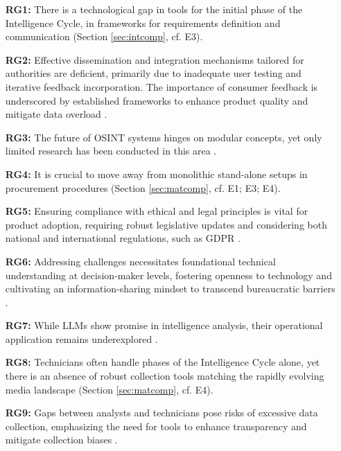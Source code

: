 \documentclass[10pt]{article}
\begin{document}
\begin{itemize}
    \item[\textbf{RG1:}] There is a technological gap in tools for the initial phase of the Intelligence Cycle, in frameworks for requirements definition and communication (Section \ref{sec:intcomp}, cf. E3).

        \item[\textbf{RG2:}]Effective dissemination and integration mechanisms tailored for authorities are deficient, primarily due to inadequate user testing and iterative feedback incorporation. The importance of consumer feedback is underscored by established frameworks to enhance product quality and mitigate data overload \cite{JointChiefsofStaffU.S.Army.2013, NorthAtlanticTreatyOrganization.2001}.

    \item[\textbf{RG3:}] The future of OSINT systems hinges on modular concepts, yet only limited research has been conducted in this area \cite{Arjun.2020,Wright.2020}.

    \item[\textbf{RG4:}] It is crucial to move away from monolithic stand-alone setups in procurement procedures (Section \ref{sec:matcomp}, cf. E1; E3; E4).

    \item[\textbf{RG5:}] Ensuring compliance with ethical and legal principles is vital for product adoption, requiring robust legislative updates and considering both national and international regulations, such as GDPR \cite{EuropeanParliament.2016,EuropeanCommission.18.08.2023,Wittmer.2022}.

    \item[\textbf{RG6:}] Addressing challenges necessitates foundational technical understanding at decision-maker levels, fostering openness to technology and cultivating an information-sharing mindset to transcend bureaucratic barriers \cite{NorthAtlanticTreatyOrganization.2001}.

    \item[\textbf{RG7:}] While LLMs show promise in intelligence analysis, their operational application remains underexplored \cite{Radford.2023}.

    \item[\textbf{RG8:}] Technicians often handle phases of the Intelligence Cycle alone, yet there is an absence of robust collection tools matching the rapidly evolving media landscape (Section \ref{sec:matcomp}, cf. E4).

    \item[\textbf{RG9:}] Gaps between analysts and technicians pose risks of excessive data collection, emphasizing the need for tools to enhance transparency and mitigate collection biases \cite{Lowenthal.2020}.
\end{itemize}
\end{document}
